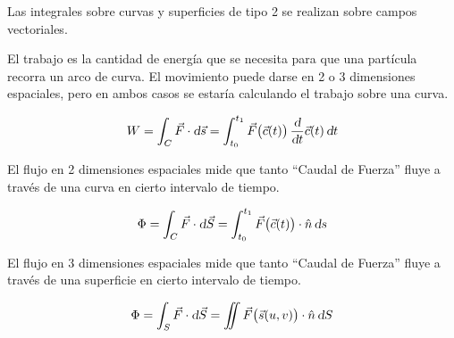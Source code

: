 
Las integrales sobre curvas y superficies de tipo 2 se realizan sobre campos vectoriales.

El trabajo es la cantidad de energía que se necesita para que una partícula recorra un arco de curva.
El movimiento puede darse en 2 o 3 dimensiones espaciales, pero en ambos casos se estaría calculando el trabajo sobre una curva.

\begin{mdframed}[style=DefinitionFrame]
    \begin{defn}
        \label{defn:type2Int}
    \end{defn}
    \begin{equation*}
        W = \int_C \Vec{F} \cdot \textsl{d} \Vec{s}
        = \int_{t_0}^{t_1} \Vec{F} \big( \Vec{c}(t) \big) \, \dfrac{\textsl{d}}{\textsl{d} t} \Vec{c}(t) \, \textsl{d} t
    \end{equation*}
\end{mdframed}

El flujo en 2 dimensiones espaciales mide que tanto ``Caudal de Fuerza'' fluye a través de una curva en cierto intervalo de tiempo.

\begin{mdframed}[style=DefinitionFrame]
    \begin{defn}
    \end{defn}
    \begin{equation*}
        \Phi = \int_C \Vec{F} \cdot \textsl{d} \Vec{S}
        = \int_{t_0}^{t_1} \Vec{F} \big( \Vec{c}(t) \big) \cdot \hat{n} \, \textsl{d} s
    \end{equation*}
\end{mdframed}

El flujo en 3 dimensiones espaciales mide que tanto ``Caudal de Fuerza'' fluye a través de una superficie en cierto intervalo de tiempo.

\begin{mdframed}[style=DefinitionFrame]
    \begin{defn}
    \end{defn}
    \begin{equation*}
        \Phi = \int_S \Vec{F} \cdot \textsl{d} \Vec{S}
        = \iint \Vec{F} \big( \Vec{s}(u,v) \big) \cdot \hat{n} \, \textsl{d} S
    \end{equation*}
\end{mdframed}
